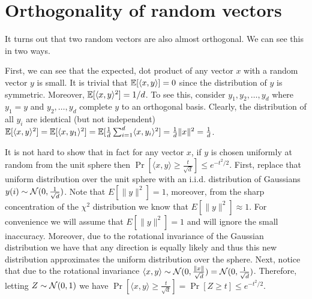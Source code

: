 \documentclass{article}
\begin{document}
\section{Orthogonality of random vectors}

It turns out that two random vectors are also almost orthogonal.
We can see this in two ways.

First, we can see that the expected, dot product of any vector $x$ with a random vector $y$ is small.
It is trivial that ${\mathbb E}[\langle x,y \rangle] = 0$ since the distribution of $y$ is symmetric.
Moreover, ${\mathbb E}[\langle x,y \rangle^2] = 1/d$.
To see this, consider $y_1,y_2,\ldots,y_d$ where $y_1 = y$ and $y_2,\ldots,y_d$ complete $y$ to an orthogonal basis.
Clearly, the distribution of all $y_i$ are identical (but not independent)
${\mathbb E}[\langle x,y \rangle^2] = {\mathbb E}[\langle x,y_1\rangle^2] = {\mathbb E}[\frac{1}{d}\sum_{i=1}^{d}\langle x,y_i\rangle^2] = \frac{1}{d}\|x\|^2 = \frac{1}{d}$.

It is not hard to show that in fact for any vector $x$, if $y$ is chosen uniformly at random from the unit sphere 
then $\Pr[ \langle x,y \rangle  \ge \frac{t}{\sqrt{d}}] \le e^{-t^2/2}$.
First, replace that uniform distribution over the unit sphere with an i.i.d. distribution of Gaussians $y(i)\sim {\mathcal{N}}(0,\frac{1}{\sqrt{d}})$.
Note that $E[\|y\|^2] = 1$, moreover, from the sharp concentration of the $\chi^2$ distribution we know that $E[\|y\|^2] \approx 1$.
For convenience we will assume that $E[\|y\|^2] = 1$ and will ignore the small inaccuracy.
Moreover, due to the rotational invariance of the Gaussian distribution we have that any direction is equally likely and thus this
new distribution approximates the uniform distribution over the sphere.
Next, notice that due to the rotational invariance $\langle x,y \rangle \sim {\mathcal{N}}(0,\frac{\|x\|}{\sqrt{d}}) = {\mathcal{N}}(0,\frac{1}{\sqrt{d}})$.
Therefore, letting $Z \sim {\mathcal{N}}(0,1)$ we have $\Pr[ \langle x,y \rangle  \ge \frac{t}{\sqrt{d}}] = \Pr[Z \ge t] \le e^{-t^2/2}$.







\end{document}
